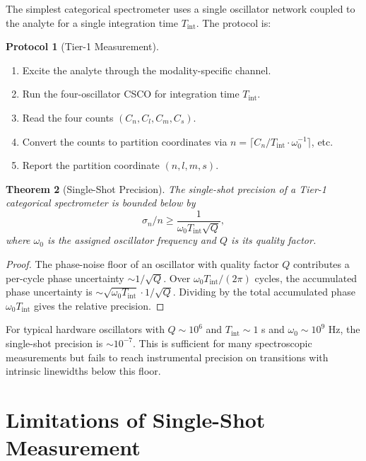 \documentclass[twocolumn,11pt,a4paper]{article}
\theoremstyle{thmstyle}
\newtheorem{theorem}{Theorem}[section]
\theoremstyle{axiomstyle}
\theoremstyle{definition}
\newtheorem{protocol}[theorem]{Protocol}
\theoremstyle{remark}
\begin{document}
The simplest categorical spectrometer uses a single oscillator network coupled to the analyte for a single integration time $T_{\mathrm{int}}$. The protocol is:

\begin{protocol}[Tier-1 Measurement]\label{prot:tier1}
\begin{enumerate}[label=\arabic*.,nosep]
\item Excite the analyte through the modality-specific channel.
\item Run the four-oscillator CSCO for integration time $T_{\mathrm{int}}$.
\item Read the four counts $(C_{n},C_{l},C_{m},C_{s})$.
\item Convert the counts to partition coordinates via $n=\lceil C_{n}/T_{\mathrm{int}}\cdot\omega_{0}^{-1}\rceil$, etc.
\item Report the partition coordinate $(n,l,m,s)$.
\end{enumerate}
\end{protocol}

\begin{theorem}[Single-Shot Precision]\label{thm:tier1prec}
The single-shot precision of a Tier-1 categorical spectrometer is bounded below by
\begin{equation}
\sigma_{n}/n\geq\frac{1}{\omega_{0}T_{\mathrm{int}}\sqrt{Q}},
\end{equation}
where $\omega_{0}$ is the assigned oscillator frequency and $Q$ is its quality factor.
\end{theorem}

\begin{proof}
The phase-noise floor of an oscillator with quality factor $Q$ contributes a per-cycle phase uncertainty $\sim 1/\sqrt{Q}$. Over $\omega_{0}T_{\mathrm{int}}/(2\pi)$ cycles, the accumulated phase uncertainty is $\sim\sqrt{\omega_{0}T_{\mathrm{int}}}\cdot 1/\sqrt{Q}$. Dividing by the total accumulated phase $\omega_{0}T_{\mathrm{int}}$ gives the relative precision.
\end{proof}

For typical hardware oscillators with $Q\sim 10^{6}$ and $T_{\mathrm{int}}\sim 1$ s and $\omega_{0}\sim 10^{9}$ Hz, the single-shot precision is $\sim 10^{-7}$. This is sufficient for many spectroscopic measurements but fails to reach instrumental precision on transitions with intrinsic linewidths below this floor.

\section{Limitations of Single-Shot Measurement}
\label{sec:tier1limits}
\end{document}
